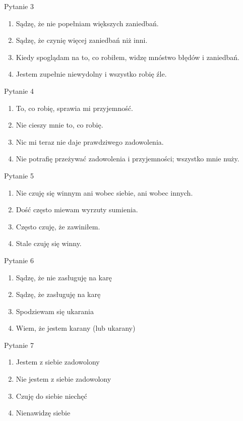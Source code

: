 \documentclass[
  openany]{book}
\providecommand{\tightlist}{%
  \setlength{\itemsep}{0pt}\setlength{\parskip}{0pt}}
\begin{document}
Pytanie 3

\begin{enumerate}
\def\labelenumi{\arabic{enumi}.}
\setcounter{enumi}{-1}
\tightlist
\item
  Sądzę, że nie popełniam większych zaniedbań.
\item
  Sądzę, że czynię więcej zaniedbań niż inni.
\item
  Kiedy spoglądam na to, co robiłem, widzę mnóstwo błędów i zaniedbań.
\item
  Jestem zupełnie niewydolny i wszystko robię źle.
\end{enumerate}

Pytanie 4

\begin{enumerate}
\def\labelenumi{\arabic{enumi}.}
\setcounter{enumi}{-1}
\tightlist
\item
  To, co robię, sprawia mi przyjemność.
\item
  Nie cieszy mnie to, co robię.
\item
  Nic mi teraz nie daje prawdziwego zadowolenia.
\item
  Nie potrafię przeżywać zadowolenia i przyjemności; wszystko mnie nuży.
\end{enumerate}

Pytanie 5

\begin{enumerate}
\def\labelenumi{\arabic{enumi}.}
\setcounter{enumi}{-1}
\tightlist
\item
  Nie czuję się winnym ani wobec siebie, ani wobec innych.
\item
  Dość często miewam wyrzuty sumienia.
\item
  Często czuję, że zawiniłem.
\item
  Stale czuję się winny.
\end{enumerate}

Pytanie 6

\begin{enumerate}
\def\labelenumi{\arabic{enumi}.}
\setcounter{enumi}{-1}
\tightlist
\item
  Sądzę, że nie zasługuję na karę
\item
  Sądzę, że zasługuję na karę
\item
  Spodziewam się ukarania
\item
  Wiem, że jestem karany (lub ukarany)
\end{enumerate}

Pytanie 7

\begin{enumerate}
\def\labelenumi{\arabic{enumi}.}
\setcounter{enumi}{-1}
\tightlist
\item
  Jestem z siebie zadowolony
\item
  Nie jestem z siebie zadowolony
\item
  Czuję do siebie niechęć
\item
  Nienawidzę siebie
\end{enumerate}
\end{document}
